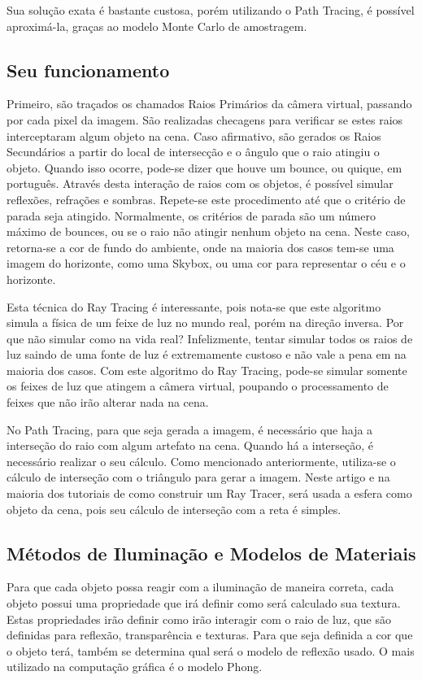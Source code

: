 \documentclass[journal]{IEEEtran}
\begin{document}
Sua solução exata é bastante custosa, porém utilizando o Path Tracing, é possível
aproximá-la, graças ao modelo Monte Carlo de amostragem.

\subsection{Seu funcionamento}
Primeiro, são traçados os chamados Raios Primários da câmera virtual, passando por cada pixel 
da imagem. São realizadas checagens para verificar se estes raios interceptaram algum 
objeto na cena.
Caso afirmativo, são gerados os Raios Secundários a partir do local de intersecção e
o ângulo que o raio atingiu o objeto. Quando isso ocorre, pode-se dizer que houve um
bounce, ou quique, em português. Através desta interação de raios com os objetos, é 
possível simular reflexões, refrações e sombras. Repete-se este procedimento até que
o critério de parada seja atingido. Normalmente, os critérios de parada são um número
máximo de bounces, ou se o raio não atingir nenhum objeto na cena. Neste caso, 
retorna-se a cor de fundo do ambiente, onde na maioria dos casos tem-se uma imagem
do horizonte, como uma Skybox, ou uma cor para representar o céu e o horizonte.

Esta técnica do Ray Tracing é interessante, pois nota-se que este algoritmo simula a física
de um feixe de luz no mundo real, porém na direção inversa. Por que não simular
como na vida real? Infelizmente, tentar simular todos os raios de luz saindo de uma fonte
de luz é extremamente custoso e não vale a pena em na maioria dos casos. Com este
algoritmo do Ray Tracing, pode-se simular somente os feixes de luz que atingem
a câmera virtual, poupando o processamento de feixes que não irão alterar nada
na cena.

No Path Tracing, para que seja gerada a imagem, é necessário que haja a interseção
do raio com algum artefato na cena. Quando há a interseção, é necessário realizar
o seu cálculo. Como mencionado anteriormente, utiliza-se o cálculo de interseção
com o triângulo para gerar a imagem. Neste artigo e na maioria dos tutoriais
de como construir um Ray Tracer, será usada a esfera como objeto da cena, pois
seu cálculo de interseção com a reta é simples.


\subsection{Métodos de Iluminação e Modelos de Materiais}
Para que cada objeto possa reagir com a iluminação de maneira correta, cada objeto
possui uma propriedade que irá definir como será calculado sua textura. Estas propriedades
irão definir como irão interagir com o raio de luz, que são definidas para reflexão,
transparência e texturas. Para que seja definida a cor que o objeto terá, também se
determina qual será o modelo de reflexão usado. O mais utilizado na computação gráfica
é o modelo Phong.
\end{document}
